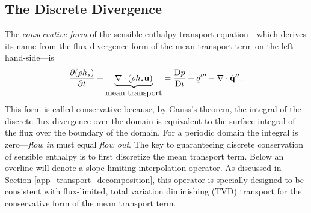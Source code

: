 

\subsection{The Discrete Divergence}
\label{discrete_divergence}

The \emph{conservative form} of the sensible enthalpy transport equation---which derives its name from the flux divergence form of the mean transport term on the left-hand-side---is
\begin{equation}
\label{eqn_conservative_enthalpy}
\frac{\partial (\rho h_s)}{\partial t} + \underbrace{\nabla\cdot(\rho h_s \mathbf{u})}_{\mbox{mean transport}} = \frac{\mbox{D} \bar{p}}{\mbox{D} t} + \dot{q}^{\prime\prime\prime} - \nabla\cdot \dot{\mathbf{q}}^{\prime\prime} \,\mbox{.}
\end{equation}
This form is called conservative because, by Gauss's theorem, the integral of the discrete flux divergence over the domain is equivalent to the surface integral of the flux over the boundary of the domain.  For a periodic domain the integral is zero---\emph{flow in} must equal \emph{flow out}. The key to guaranteeing discrete conservation of sensible enthalpy is to first discretize the mean transport term.  Below an overline will denote a slope-limiting interpolation operator.  As discussed in Section \ref{app_transport_decomposition}, this operator is specially designed to be consistent with flux-limited, total variation diminishing (TVD) transport for the conservative form of the mean transport term.

